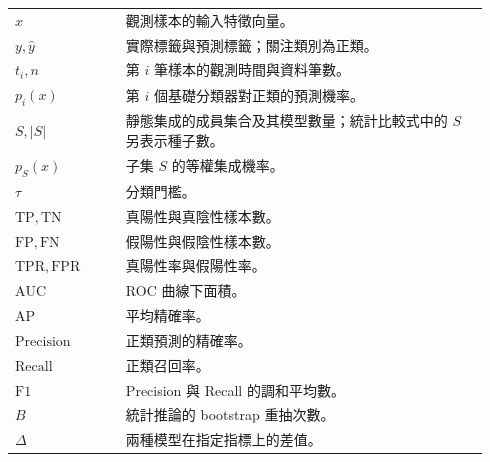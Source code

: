 \clearpage
{}
\noindent
\begin{tabular}{@{}p{0.22\linewidth}p{0.72\linewidth}@{}}
\(x\) & 觀測樣本的輸入特徵向量。\\
\(y,\hat y\) & 實際標籤與預測標籤；關注類別為正類。\\
\(t_i,n\) & 第 \(i\) 筆樣本的觀測時間與資料筆數。\\
\(p_i(x)\) & 第 \(i\) 個基礎分類器對正類的預測機率。\\
\(S,|S|\) & 靜態集成的成員集合及其模型數量；統計比較式中的 \(S\) 另表示種子數。\\
\(p_S(x)\) & 子集 \(S\) 的等權集成機率。\\
\(\tau\) & 分類門檻。\\
\(\mathrm{TP},\mathrm{TN}\) & 真陽性與真陰性樣本數。\\
\(\mathrm{FP},\mathrm{FN}\) & 假陽性與假陰性樣本數。\\
\(\mathrm{TPR},\mathrm{FPR}\) & 真陽性率與假陽性率。\\
\(\mathrm{AUC}\) & ROC 曲線下面積。\\
\(\mathrm{AP}\) & 平均精確率。\\
\(\mathrm{Precision}\) & 正類預測的精確率。\\
\(\mathrm{Recall}\) & 正類召回率。\\
\(\mathrm{F1}\) & Precision 與 Recall 的調和平均數。\\
\(B\) & 統計推論的 bootstrap 重抽次數。\\
\(\Delta\) & 兩種模型在指定指標上的差值。\\
\end{tabular}
